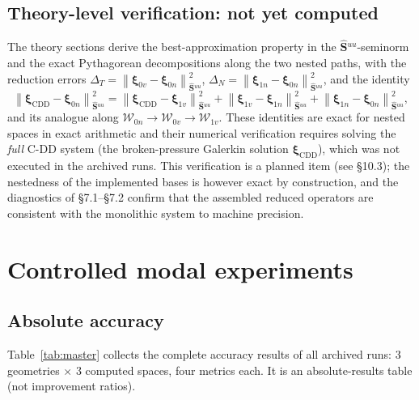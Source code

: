 \documentclass[11pt,a4paper]{article}
\newcommand{\Schur}{\mathbf{S}}
\newcommand{\Shatuu}{\widehat{\Schur}{}^{uu}}
\newcommand{\Wspace}{\mathcal{W}}
\newcommand{\xiX}[1]{\bm{\xi}_{#1}}
\newcommand{\norm}[1]{\left\|#1\right\|}
\begin{document}
\subsection{Theory-level verification: not yet computed}
\label{sec:theoryverify}

The theory sections derive the best-approximation property in the
$\Shatuu$-seminorm and the exact Pythagorean decompositions along the
two nested paths, with the reduction errors
$\Delta_T=\norm{\xiX{0v}-\xiX{0n}}_{\Shatuu}^2$,
$\Delta_N=\norm{\xiX{1n}-\xiX{0n}}_{\Shatuu}^2$, and the identity
\begin{equation}
  \norm{\xiX{\mathrm{CDD}}-\xiX{0n}}_{\Shatuu}^2 =
  \norm{\xiX{\mathrm{CDD}}-\xiX{1v}}_{\Shatuu}^2
  + \norm{\xiX{1v}-\xiX{1n}}_{\Shatuu}^2
  + \norm{\xiX{1n}-\xiX{0n}}_{\Shatuu}^2,
\end{equation}
and its analogue along $\Wspace_{0n}\to\Wspace_{0v}\to\Wspace_{1v}$.
These identities are exact for nested spaces in exact arithmetic and
their numerical verification requires solving the \emph{full} C-DD
system (the broken-pressure Galerkin solution $\xiX{\mathrm{CDD}}$),
which was not executed in the archived runs.  This verification is a
planned item (see \S10.3); the nestedness of the implemented bases is
however exact by construction, and the diagnostics of
\S7.1--\S7.2 confirm that the assembled reduced operators are consistent
with the monolithic system to machine precision.

\section{Controlled modal experiments}
\label{sec:modal}

\subsection{Absolute accuracy}
\label{sec:accuracy}

Table~\ref{tab:master} collects the complete accuracy results of all
archived runs: 3 geometries $\times$ 3 computed spaces, four metrics
each.  It is an absolute-results table (not improvement ratios).
\end{document}
